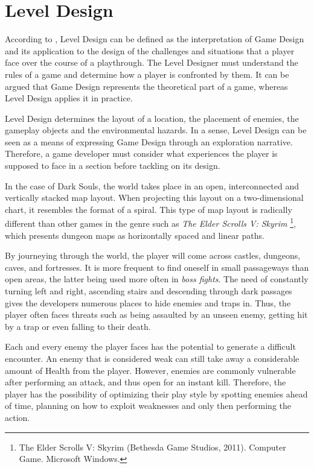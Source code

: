 
\section{Level Design}
\label{sec:level-design-dark-souls}

According to \cite{BOOK_LevelDesignConcept}, Level Design can be defined as the interpretation of Game Design and its application to the design of the challenges and situations that a player face over the course of a playthrough. The Level Designer must understand the rules of a game and determine how a player is confronted by them. It can be argued that Game Design represents the theoretical part of a game, whereas Level Design applies it in practice.

Level Design determines the layout of a location, the placement of enemies, the gameplay objects and the environmental hazards. In a sense, Level Design can be seen as a means of expressing Game Design through an exploration narrative. Therefore, a game developer must consider what experiences the player is supposed to face in a section before tackling on its design.

In the case of Dark Souls, the world takes place in an open, interconnected and vertically stacked map layout. When projecting this layout on a two-dimensional chart, it resembles the format of a spiral. This type of map layout is radically different than other games in the genre such as \emph{The Elder Scrolls V: Skyrim} \footnote{The Elder Scrolls V: Skyrim (Bethesda Game Studios, 2011). Computer Game. Microsoft Windows.}, which presents dungeon maps as horizontally spaced and linear paths.

By journeying through the world, the player will come across castles, dungeons, caves, and fortresses. It is more frequent to find oneself in small passageways than open areas, the latter being used more often in \emph{boss fights}. The need of constantly turning left and right, ascending stairs and descending through dark passages gives the developers numerous places to hide enemies and traps in. Thus, the player often faces threats such as being assaulted by an unseen enemy, getting hit by a trap or even falling to their death.

Each and every enemy the player faces has the potential to generate a difficult encounter. An enemy that is considered weak can still take away a considerable amount of Health from the player. However, enemies are commonly vulnerable after performing an attack, and thus open for an instant kill. Therefore, the player has the possibility of optimizing their play style by spotting enemies ahead of time, planning on how to exploit weaknesses and only then performing the action.

